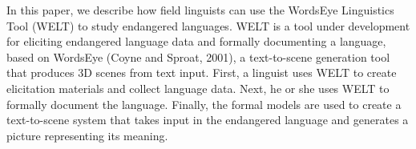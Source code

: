 In this paper, we describe how field linguists can use the WordsEye Linguistics Tool (WELT) to study endangered languages. WELT is a tool under development for eliciting endangered language data and formally documenting a language, based on WordsEye (Coyne and Sproat, 2001), a text-to-scene generation tool that produces 3D scenes from text input. First, a linguist uses WELT to create elicitation materials and collect language data. Next, he or she uses WELT to formally document the language. Finally, the formal models are used to create a text-to-scene system that takes input in the endangered language and generates a picture representing its meaning.
